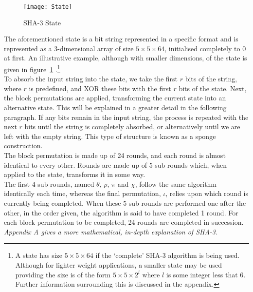 \begin{figure}[h]
\label{fig:stateFigure}
\texttt{[image: State]}
\centering
\caption{SHA-3 State \cite{KeccakSite}}
\label{fig:stateFigure}
\end{figure}
\noindent The aforementioned state is a bit string represented in a specific format and is represented as a 3-dimensional array of size $5 \times 5 \times 64$, initialised completely to 0 at first. An illustrative example, although with smaller dimensions, of the state is given in figure~\ref{fig:stateFigure} \cite{KeccakSite}.\footnote{A state has size $ 5 \times 5 \times 64 $ if the `complete' SHA-3 algorithm is being used. Although for lighter weight applications, a smaller state may be used providing the size is of the form $5 \times 5 \times 2^{l}$ where $l$ is some integer less that $6$. Further information surrounding this is discussed in the appendix.}
\vspace{5 mm}\\
To absorb the input string into the state, we take the first $r$ bits of the string, where $r$ is predefined, and XOR these bits with the first $r$ bits of the state. Next, the block permutations are applied, transforming the current state into an alternative state. This will be explained in a greater detail in the following paragraph. If any bits remain in the input string, the process is repeated with the next $r$ bits until the string is completely absorbed, or alternatively until we are left with the empty string. This type of structure is known as a sponge construction.
\vspace{5 mm}\\
The block permutation is made up of 24 rounds, and each round is almost identical to every other. Rounds are made up of 5 sub-rounds which, when applied to the state, transforms it in some way.
\vspace{5 mm}\\
The first 4 sub-rounds, named $\theta$, $\rho$, $\pi$ and $\chi$, follow the same algorithm identically each time, whereas the final permutation, $\iota$, relies upon which round is currently being completed. When these 5 sub-rounds are performed one after the other, in the order given, the algorithm is said to have completed 1 round. For each block permutation to be completed, 24 rounds are completed in succession.
\vspace{5 mm}\\
\textit{Appendix A gives a more mathematical, in-depth explanation of SHA-3.}
